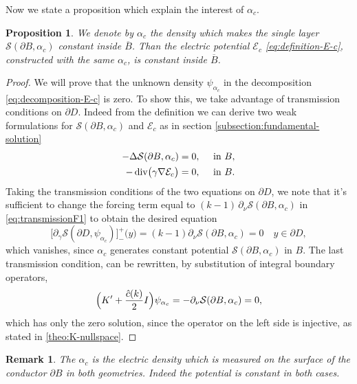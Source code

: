 \documentclass[10pt, a4paper, twoside, openright]{book}
\theoremstyle{definition}
\theoremstyle{plain}
\theoremstyle{plain}
\theoremstyle{plain}
\newtheorem{proposition}[subsection]{Proposition}
\theoremstyle{plain}
\newtheorem{remark}[subsection]{Remark}
\theoremstyle{plain}
\theoremstyle{plain}
\theoremstyle{plain}
\theoremstyle{plain}
\DeclareMathOperator{\divergence}{div}
\begin{document}
Now we state a proposition which explain the interest of $\alpha_{c}$.
\begin{proposition}
\label{prop:alpha_c-both-problems}
 We denote by $\alpha_{c}$ the density which makes the single layer $\mathcal{S}(\partial B, \alpha_{c})$ constant inside $\overline{B}$.
 Than the electric potential $\mathcal{E}_{c}$ \eqref{eq:definition-E-c}, constructed with the same $\alpha_{c}$, is constant inside $\overline{B}$.
\end{proposition}
\begin{proof}
We will prove that the unknown density $\psi_{\alpha_c}$ in the decomposition \eqref{eq:decomposition-E-c} is zero. 
To show this, we take advantage of transmission conditions on $\partial D$. 
Indeed from the definition we can derive two weak formulations for 
$\mathcal{S}(\partial B, \alpha_c)$ and $\mathcal{E}_c$ 
as in section \ref{subsection:fundamental-solution}
\begin{align}
 -\Delta\mathcal{S}(\partial B,\alpha_c) &= 0,\quad\textup{ in }B,\\
 -\divergence\bigl(\gamma\nabla\mathcal{E}_c\bigr) &= 0,\quad\textup{ in }B.
\end{align}
Taking the transmission conditions of the two equations on $\partial D$, we note that it's sufficient to change the forcing term equal to $(k-1)\,\partial_\nu\mathcal{S}(\partial B, \alpha_{c})$ in \eqref{eq:transmissionF1} to obtain the desired equation
\begin{equation}
 \bigl[\partial_\gamma \mathcal{S}(\partial D,\psi_{\alpha_{c}})\bigr]^+_-\bigl(y\bigr) = (k - 1)\partial_\nu \mathcal{S}(\partial B,\alpha_{c})=0 \quad y \in\partial D,
\end{equation}
which vanishes, since $\alpha_{c}$ generates constant potential $\mathcal{S}(\partial B,\alpha_{c})$ in $B$. The last transmission condition, can be rewritten, by substitution of integral boundary operators,
\begin{equation}
 \Bigl(K' + \frac{\hat{c}(k)}{2} I\Bigr)\psi_{\alpha_c} = -\partial_\nu \mathcal{S}(\partial B, \alpha_c) = 0,
\end{equation}
which has only the zero solution, since the operator on the left side is injective, as stated in \ref{theo:K-nullspace}.
\end{proof}
\begin{remark}
 The $\alpha_c$ is the electric density which is measured on the surface of the conductor $\partial B$ in both geometries. Indeed the potential is constant in both cases.
\end{remark}
\end{document}
